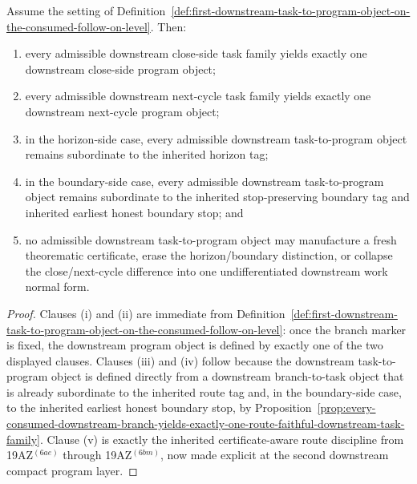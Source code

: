 \begin{proposition}
\label{prop:every-consumed-downstream-task-family-yields-exactly-one-compact-downstream-program-object}
Assume the setting of Definition~\ref{def:first-downstream-task-to-program-object-on-the-consumed-follow-on-level}. Then:
\begin{enumerate}[label=(\roman*)]
  \item every admissible downstream close-side task family yields exactly one downstream close-side program object;
  \item every admissible downstream next-cycle task family yields exactly one downstream next-cycle program object;
  \item in the horizon-side case, every admissible downstream task-to-program object remains subordinate to the inherited horizon tag;
  \item in the boundary-side case, every admissible downstream task-to-program object remains subordinate to the inherited stop-preserving boundary tag and inherited earliest honest boundary stop; and
  \item no admissible downstream task-to-program object may manufacture a fresh theorematic certificate, erase the horizon/boundary distinction, or collapse the close/next-cycle difference into one undifferentiated downstream work normal form.
\end{enumerate}
\end{proposition}

\begin{proof}
Clauses (i) and (ii) are immediate from Definition~\ref{def:first-downstream-task-to-program-object-on-the-consumed-follow-on-level}: once the branch marker is fixed, the downstream program object is defined by exactly one of the two displayed clauses. Clauses (iii) and (iv) follow because the downstream task-to-program object is defined directly from a downstream branch-to-task object that is already subordinate to the inherited route tag and, in the boundary-side case, to the inherited earliest honest boundary stop, by Proposition~\ref{prop:every-consumed-downstream-branch-yields-exactly-one-route-faithful-downstream-task-family}. Clause (v) is exactly the inherited certificate-aware route discipline from 19AZ$^{(6ae)}$ through 19AZ$^{(6bm)}$, now made explicit at the second downstream compact program layer.
\end{proof}

